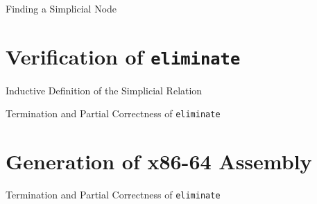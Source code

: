 \documentclass[aspectratio=169,xcolor=dvipsnames]{beamer}
\begin{document}
\begin{frame}{Finding a Simplicial Node}

\end{frame}

\section{Verification of \texttt{eliminate}}

\begin{frame}{Inductive Definition of the Simplicial Relation}

\end{frame}

\begin{frame}{Termination and Partial Correctness of \texttt{eliminate}}

\end{frame}

\section{Generation of x86-64 Assembly}

\begin{frame}{Termination and Partial Correctness of \texttt{eliminate}}

\end{frame}




\end{document}

